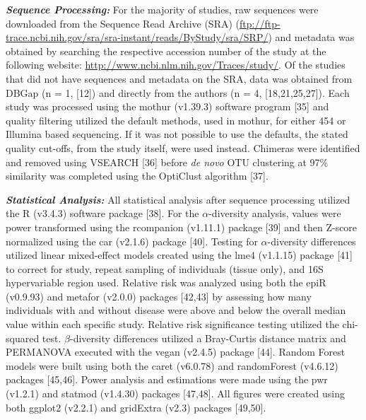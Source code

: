 \documentclass[12pt,]{article}
\begin{document}
\textbf{\emph{Sequence Processing:}} For the majority of studies, raw
sequences were downloaded from the Sequence Read Archive (SRA)
(\url{ftp://ftp-trace.ncbi.nih.gov/sra/sra-instant/reads/ByStudy/sra/SRP/})
and metadata was obtained by searching the respective accession number
of the study at the following website:
\url{http://www.ncbi.nlm.nih.gov/Traces/study/}. Of the studies that did
not have sequences and metadata on the SRA, data was obtained from DBGap
(n = 1, {[}12{]}) and directly from the authors (n = 4,
{[}18,21,25,27{]}). Each study was processed using the mothur (v1.39.3)
software program {[}35{]} and quality filtering utilized the default
methods, used in mothur, for either 454 or Illumina based sequencing. If
it was not possible to use the defaults, the stated quality cut-offs,
from the study itself, were used instead. Chimeras were identified and
removed using VSEARCH {[}36{]} before \emph{de novo} OTU clustering at
97\% similarity was completed using the OptiClust algorithm {[}37{]}.

\textbf{\emph{Statistical Analysis:}} All statistical analysis after
sequence processing utilized the R (v3.4.3) software package {[}38{]}.
For the \(\alpha\)-diversity analysis, values were power transformed
using the rcompanion (v1.11.1) package {[}39{]} and then Z-score
normalized using the car (v2.1.6) package {[}40{]}. Testing for
\(\alpha\)-diversity differences utilized linear mixed-effect models
created using the lme4 (v1.1.15) package {[}41{]} to correct for study,
repeat sampling of individuals (tissue only), and 16S hypervariable
region used. Relative risk was analyzed using both the epiR (v0.9.93)
and metafor (v2.0.0) packages {[}42,43{]} by assessing how many
individuals with and without disease were above and below the overall
median value within each specific study. Relative risk significance
testing utilized the chi-squared test. \(\beta\)-diversity differences
utilized a Bray-Curtis distance matrix and PERMANOVA executed with the
vegan (v2.4.5) package {[}44{]}. Random Forest models were built using
both the caret (v6.0.78) and randomForest (v4.6.12) packages
{[}45,46{]}. Power analysis and estimations were made using the pwr
(v1.2.1) and statmod (v1.4.30) packages {[}47,48{]}. All figures were
created using both ggplot2 (v2.2.1) and gridExtra (v2.3) packages
{[}49,50{]}.
\end{document}
